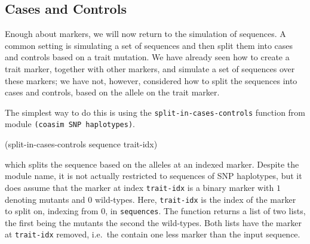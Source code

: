 \documentclass{manual}
\begin{document}
\subsection{Cases and Controls}
\label{sec:cases-controls}

Enough about markers, we will now return to the simulation of
sequences.  A common setting is simulating a set of sequences and then
split them into cases and controls based on a trait mutation.  We have
already seen how to create a trait marker, together with other
markers, and simulate a set of sequences over these markers; we have
not, however, considered how to split the sequences into cases and
controls, based on the allele on the trait marker.

The simplest way to do this is using the
\texttt{split-in-cases-controls} function from module \texttt{(coasim
  SNP haplotypes)}.
\begin{code}
(split-in-cases-controls sequence trait-idx)
\end{code}
which splits the sequence based on the alleles at an indexed marker.
Despite the module name, it is not actually restricted to sequences of
SNP haplotypes, but it does assume that the marker at index
\texttt{trait-idx} is a binary marker with $1$ denoting mutants and
$0$ wild-types.  Here, \texttt{trait-idx} is the index of the marker
to split on, indexing from $0$, in \texttt{sequences}.  The function
returns a list of two lists, the first being the mutants the second
the wild-types.  Both lists have the marker at \texttt{trait-idx}
removed, i.e.\ the contain one less marker than the input sequence.
\end{document}
